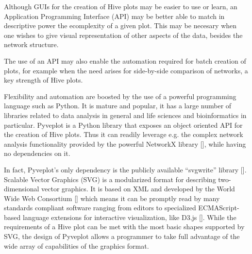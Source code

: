 \documentclass{bioinfo}
\begin{document}
Although GUIs for the creation of Hive plots may be easier to use or learn,
an Application Programming Interface (API) may be better able to match
in descriptive power the ecomplexity of a given plot. This may be
necesary when one wishes to give visual representation of other
aspects of the data, besides the network structure.

The use of an API may also enable the automation required for batch
creation of plots, for example when the need arises for side-by-side
comparison of networks, a key strength of Hive plots.

Flexibility and automation are boosted by the use of a powerful
programming language such as Python. It is mature and popular, it has
a large number of libraries related to data analysis in general and
life sciences and bioinformatics in particular. Pyveplot is a Python
library that exposes an object oriented API for the creation of Hive
plots. Thus it can readily leverage e.g. the complex network analysis
functionality provided by the powerful NetworkX library
[\cite{hagberg-2008-exploring}], while having no dependencies on it.

In fact, Pyveplot's only dependency is the publicly available
``svgwrite'' library [\cite{svgwrite}]. Scalable Vector Graphics (SVG)
is a modularized format for describing two-dimensional vector
graphics. It is based on XML and developed by the World Wide Web
Consortium [\cite{McCormack:11:SVG}] which means it can be promptly
read by many standards compliant software ranging from editors to
specialized ECMAScript-based language extensions for interactive
visualization, like D3.js [\cite{bostock2011d3}]. While the
requirements of a Hive plot can be met with the most basic shapes
supported by SVG, the design of Pyveplot allows a programmer to take
full advantage of the wide array of capabilities of the graphics
format.
\end{document}
